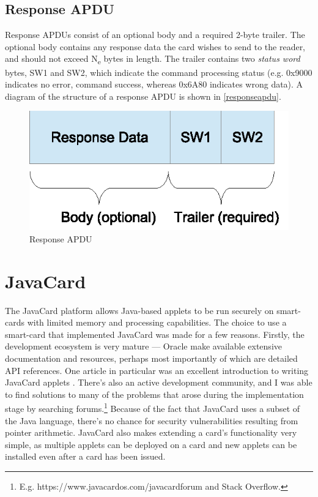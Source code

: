\documentclass[12pt,a4paper,twoside,openright]{report}
\begin{document}
\subsection{Response APDU}

Response APDUs consist of an optional body and a required 2-byte trailer. The optional body contains any response data the card wishes to send to the reader, and should not exceed N\textsubscript{e} bytes in length. The trailer contains two \emph{status word} bytes, SW1 and SW2, which indicate the command processing status (e.g. 0x9000 indicates no error, command success, whereas 0x6A80 indicates wrong data). A diagram of the structure of a response APDU is shown in \autoref{responseapdu}.

\begin{figure}[tbh]
\centerline{\includegraphics{figures/responseapdu.eps}}
\caption{Response APDU}
\label{responseapdu}
\end{figure}

\section{JavaCard}

The JavaCard platform allows Java-based applets to be run securely on smart-cards with limited memory and processing capabilities. The choice to use a smart-card that implemented JavaCard was made for a few reasons. Firstly, the development ecosystem is very mature --- Oracle make available extensive documentation and resources, perhaps most importantly of which are detailed API references. One article in particular was an excellent introduction to writing JavaCard applets \cite{writingapplets}. There's also an active development community, and I was able to find solutions to many of the problems that arose during the implementation stage by searching forums.\footnote{E.g. https://www.javacardos.com/javacardforum and Stack Overflow.} Because of the fact that JavaCard uses a subset of the Java language, there's no chance for security vulnerabilities resulting from pointer arithmetic. JavaCard also makes extending a card's functionality very simple, as multiple applets can be deployed on a card and new applets can be installed even after a card has been issued.
\end{document}
